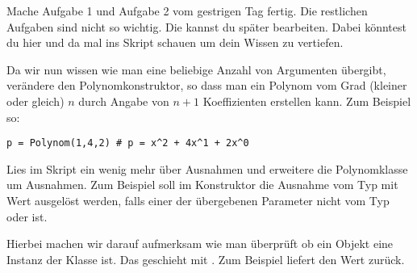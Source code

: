 \begin{aufg}
  Mache Aufgabe 1 und Aufgabe 2 vom gestrigen Tag fertig.
  Die restlichen Aufgaben sind nicht so wichtig. Die kannst du später bearbeiten.
  Dabei könntest du hier und da mal ins Skript schauen um dein Wissen zu vertiefen.
\end{aufg}

\begin{aufg}
  Da wir nun wissen wie man eine beliebige Anzahl von Argumenten übergibt, verändere den Polynomkonstruktor,
  so dass man ein Polynom vom Grad (kleiner oder gleich) $n$ durch Angabe von $n+1$ Koeffizienten erstellen kann.
  Zum Beispiel so:
  \begin{lstlisting}
p = Polynom(1,4,2) # p = x^2 + 4x^1 + 2x^0
  \end{lstlisting}
\end{aufg}

\begin{aufg}
  Lies im Skript ein wenig mehr über Ausnahmen und erweitere die Polynomklasse um Ausnahmen.
  Zum Beispiel soll im Konstruktor die Ausnahme  vom Typ  mit Wert  ausgelöst werden,
  falls einer der übergebenen Parameter nicht vom Typ  oder  ist.
  
  Hierbei machen wir darauf aufmerksam wie man überprüft ob ein Objekt  eine Instanz der Klasse  ist.
  Das geschieht mit .
  Zum Beispiel liefert  den Wert  zurück.
\end{aufg}

